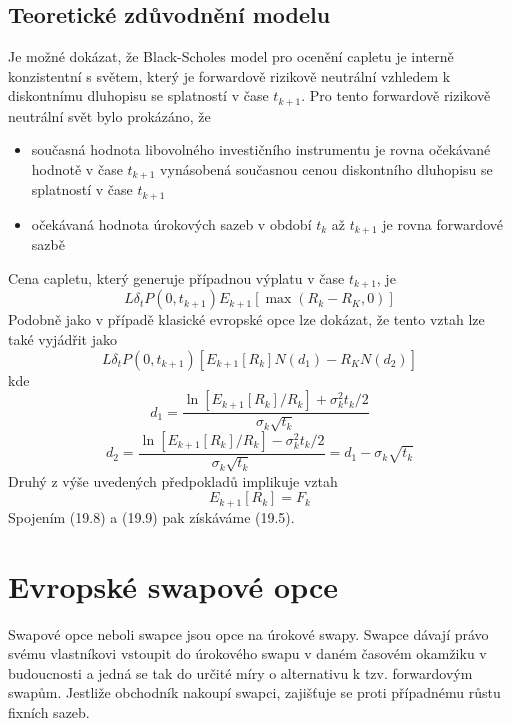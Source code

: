 \documentclass[a4paper]{book}
\begin{document}
\subsection{Teoretické zdůvodnění modelu}

Je možné dokázat, že Black-Scholes model pro ocenění capletu je interně konzistentní s světem, který je forwardově rizikově neutrální vzhledem k diskontnímu dluhopisu se splatností v čase $t_{k+1}$. Pro tento forwardově rizikově neutrální svět bylo prokázáno, že
\begin{itemize}
\item současná hodnota libovolného investičního instrumentu je rovna očekávané hodnotě v čase $t_{k+1}$ vynásobená současnou cenou diskontního dluhopisu se splatností v čase $t_{k+1}$
\item očekávaná hodnota úrokových sazeb v období $t_k$ až $t_{k+1}$ je rovna forwardové sazbě
\end{itemize}
Cena capletu, který generuje případnou výplatu v čase $t_{k+1}$, je
\begin{equation*}
L \delta_t P(0,t_{k+1})E_{k+1}[\max(R_k - R_K, 0)]
\end{equation*}
Podobně jako v případě klasické evropské opce lze dokázat, že tento vztah lze také vyjádřit jako
\begin{equation}
L \delta_t P(0, t_{k+1})[E_{k+1}[R_k]N(d_1) - R_KN(d_2)]
\end{equation}
kde
\begin{equation*}
d_1 = \frac{\ln[E_{k+1}[R_k]/R_k]+\sigma_k^2 t_k/2}{\sigma_k \sqrt{t_k}}
\end{equation*}
\begin{equation*}
d_2 = \frac{\ln[E_{k+1}[R_k]/R_k]-\sigma_k^2 t_k/2}{\sigma_k \sqrt{t_k}}=d_1 - \sigma_k \sqrt{t_k}
\end{equation*}
Druhý z výše uvedených předpokladů implikuje vztah
\begin{equation}
E_{k+1}[R_k]=F_k
\end{equation}
Spojením (19.8) a (19.9) pak získáváme (19.5).

\section{Evropské swapové opce}

Swapové opce neboli swapce jsou opce na úrokové swapy. Swapce dávají právo svému vlastníkovi vstoupit do úrokového swapu v daném časovém okamžiku v budoucnosti a jedná se tak do určité míry o alternativu k tzv. forwardovým swapům. Jestliže obchodník nakoupí swapci, zajišťuje se proti případnému růstu fixních sazeb.
\end{document}
